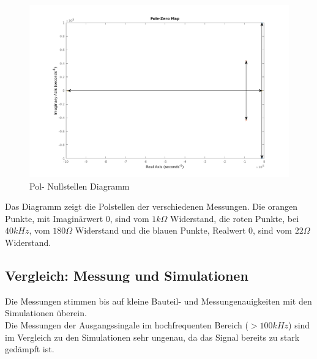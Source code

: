 \begin{figure}[H]
  \begin{center}
    \includegraphics[width=1\textwidth]{./PoleZeroMap.png}
    \caption{Pol- Nullstellen Diagramm}
  \end{center}
\end{figure}
\noindent
Das Diagramm zeigt die Polstellen der verschiedenen Messungen. Die orangen Punkte, mit Imaginärwert 0, sind vom $1k\Omega$ Widerstand, die roten Punkte, bei $40kHz$, vom $180\Omega$ Widerstand und die
blauen Punkte, Realwert 0, sind vom $22\Omega$ Widerstand.

\subsection{Vergleich: Messung und Simulationen}
Die Messungen stimmen bis auf kleine Bauteil- und Messungenauigkeiten mit den Simulationen \"uberein. \\
Die Messungen der Ausgangssingale im hochfrequenten Bereich ($>100kHz$) sind im Vergleich zu den Simulationen sehr ungenau, da das Signal bereits zu stark ged\"ampft ist. \newpage
